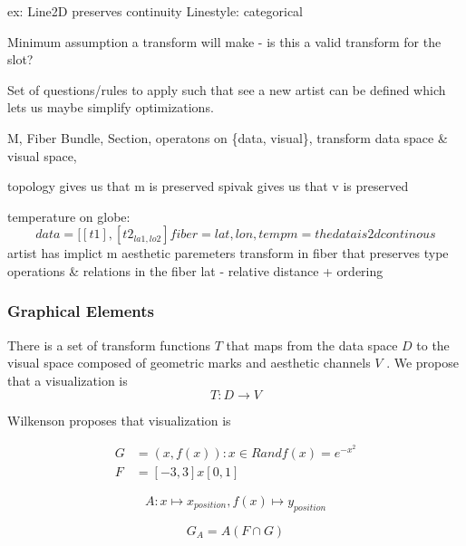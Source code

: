 \documentclass[letterpaper,onecolumn,titlepage]{Ythesis}
\begin{document}
ex: 
Line2D preserves continuity
Linestyle: categorical 


Minimum assumption a transform will make - is this a valid transform for the slot? 

Set of questions/rules to apply such that see a new artist can be defined which lets us maybe simplify optimizations.  

M, Fiber Bundle, Section, operatons on \{data, visual\}, transform data space \& visual space,  

topology gives us that m is preserved
spivak gives us that v is preserved


temperature on globe:
\begin{equation}
data = [[t1], [t2_{la1, lo2}]
fiber = {lat, lon, temp}
m = the data is 2d continous
\end{equation}
artist has implict m
aesthetic paremeters transform in fiber that preserves type operations \& relations in the fiber
lat - relative distance + ordering 

\subsubsection{Graphical Elements}
There is a set of transform functions $T$ that maps from the data space $D$ to the visual space composed of geometric marks and aesthetic channels $V$ \cite{bertinIIPropertiesGraphic2011, munznerMarksChannels}.  We propose that a visualization is 
\begin{equation}
    T: D \rightarrow V
\end{equation}

Wilkenson proposes  that visualization is  \cite{wilkinsonGrammarGraphics2005, wilkinsonMathematicalFoundationAnalytic2010}

\begin{align}
\label{eq:gog_data_range}
G &= {(x, f(x)): x \in R and f(x)=e^{-x^2}}\\
F &= [-3,3] x [0,1]
\end{align}

\begin{equation}
\label{eq:gog_aesthetic_mapping}
A: x \mapsto x_{position}, f(x) \mapsto y_{position}
\end{equation}

\begin{equation}
G_{A} = A(F \cap G) 
\end{equation}
\end{document}
